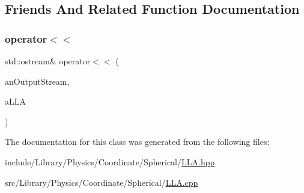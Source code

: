 \subsection{Friends And Related Function Documentation}
\mbox{\label{classlibrary_1_1physics_1_1coord_1_1spherical_1_1_l_l_a_a4e052cf41d11b11c943ad32cd4c25ba8}} 
\subsubsection{\texorpdfstring{operator$<$$<$}{operator<<}}
{\footnotesize\ttfamily std\+::ostream\& operator$<$$<$ (\begin{DoxyParamCaption}\item[{std\+::ostream \&}]{an\+Output\+Stream,  }\item[{const \hyperlink{classlibrary_1_1physics_1_1coord_1_1spherical_1_1_l_l_a}{L\+LA} \&}]{a\+L\+LA }\end{DoxyParamCaption})\hspace{0.3cm}{\ttfamily [friend]}}



The documentation for this class was generated from the following files\+:\begin{DoxyCompactItemize}
\item 
include/\+Library/\+Physics/\+Coordinate/\+Spherical/\hyperlink{_l_l_a_8hpp}{L\+L\+A.\+hpp}\item 
src/\+Library/\+Physics/\+Coordinate/\+Spherical/\hyperlink{_l_l_a_8cpp}{L\+L\+A.\+cpp}\end{DoxyCompactItemize}

